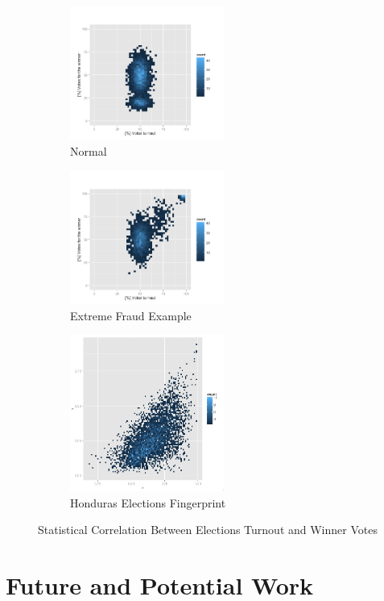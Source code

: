 \documentclass[letterpaper,10pt]{article}
\begin{document}
\begin{figure}
\centering
\begin{subfigure}{.3\textwidth}
  \centering
  \includegraphics[width=2in]{images/normal}
  \caption{Normal}
  \label{fig:normal}
\end{subfigure}%
\begin{subfigure}{.3\textwidth}
  \centering
  \includegraphics[width=2in]{images/extreme}
  \caption{Extreme Fraud Example}
  \label{fig:extreme}
\end{subfigure}
\begin{subfigure}{.3\textwidth}
  \centering
  \includegraphics[width=2in]{images/fingerprint}
  \caption{Honduras Elections Fingerprint}
  \label{fig:fingerprint}
\end{subfigure}

\caption{Statistical Correlation Between Elections Turnout and Winner Votes}
\label{fig:test}
\end{figure}


\section{Future and Potential Work}
\end{document}
